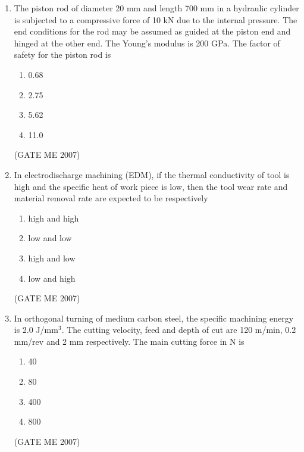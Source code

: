 \documentclass[journal]{IEEEtran}
\begin{document}
\begin{enumerate}
\item The piston rod of diameter 20 mm and length 700 mm in a hydraulic cylinder is subjected to a compressive force of 10 kN due to the internal pressure. The end conditions for the rod may be assumed as guided at the piston end and hinged at the other end. The Young’s modulus is 200 GPa. The factor of safety for the piston rod is
\begin{multicols}{4}
\begin{enumerate}
\item 0.68
\item 2.75
\item 5.62
\item 11.0
\end{enumerate}
\end{multicols}
\hfill (GATE ME 2007)

\item In electrodischarge machining (EDM), if the thermal conductivity of tool is high and the specific heat of work piece is low, then the tool wear rate and material removal rate are expected to be respectively
\begin{multicols}{2}
\begin{enumerate}
\item high and high
\item low and low
\item high and low
\item low and high
\end{enumerate}
\end{multicols}
\hfill (GATE ME 2007)

\item In orthogonal turning of medium carbon steel, the specific machining energy is 2.0 J/mm\(^3\). The cutting velocity, feed and depth of cut are 120 m/min, 0.2 mm/rev and 2 mm respectively. The main cutting force in N is
\begin{multicols}{4}
\begin{enumerate}
\item 40
\item 80
\item 400
\item 800
\end{enumerate}
\end{multicols}
\hfill (GATE ME 2007)


\end{enumerate}
\end{document}
